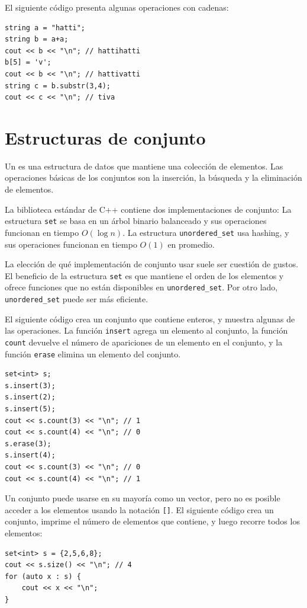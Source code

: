 El siguiente código presenta algunas operaciones con cadenas:

\begin{lstlisting}
string a = "hatti";
string b = a+a;
cout << b << "\n"; // hattihatti
b[5] = 'v';
cout << b << "\n"; // hattivatti
string c = b.substr(3,4);
cout << c << "\n"; // tiva
\end{lstlisting}

\section{Estructuras de conjunto}


Un  es una estructura de datos que
mantiene una colección de elementos.
Las operaciones básicas de los conjuntos son la
inserción, la búsqueda y la eliminación de elementos.

La biblioteca estándar de C++ contiene dos implementaciones
de conjunto:
La estructura \texttt{set} se basa en un árbol
binario balanceado y sus operaciones funcionan en tiempo $O(\log n)$.
La estructura \texttt{unordered\_set} usa hashing,
y sus operaciones funcionan en tiempo $O(1)$ en promedio.

La elección de qué implementación de conjunto usar
suele ser cuestión de gustos.
El beneficio de la estructura \texttt{set}
es que mantiene el orden de los elementos
y ofrece funciones que no están disponibles
en \texttt{unordered\_set}.
Por otro lado, \texttt{unordered\_set}
puede ser más eficiente.

El siguiente código crea un conjunto
que contiene enteros,
y muestra algunas de las operaciones.
La función \texttt{insert} agrega un elemento al conjunto,
la función \texttt{count} devuelve el número de apariciones
de un elemento en el conjunto,
y la función \texttt{erase} elimina un elemento del conjunto.

\begin{lstlisting}
set<int> s;
s.insert(3);
s.insert(2);
s.insert(5);
cout << s.count(3) << "\n"; // 1
cout << s.count(4) << "\n"; // 0
s.erase(3);
s.insert(4);
cout << s.count(3) << "\n"; // 0
cout << s.count(4) << "\n"; // 1
\end{lstlisting}

Un conjunto puede usarse en su mayoría como un vector,
pero no es posible acceder a
los elementos usando la notación \texttt{[]}.
El siguiente código crea un conjunto,
imprime el número de elementos que contiene, y luego
recorre todos los elementos:
\begin{lstlisting}
set<int> s = {2,5,6,8};
cout << s.size() << "\n"; // 4
for (auto x : s) {
    cout << x << "\n";
}
\end{lstlisting}

